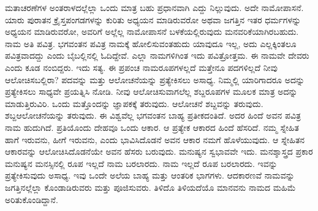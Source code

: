 ಮತಾಚರಣೆಗಳ ಅಂತರಾಳದಲ್ಲೆಲ್ಲಾ ಒಂದು ಮಾತ್ರ ಬಹು ಪ್ರಧಾನವಾಗಿ ಎದ್ದು ನಿಲ್ಲುವುದು. ಅದೇ ನಾಮೋಪಾಸನೆ. ಯಾರು ಪುರಾತನ ಕ್ರೈಸ್ತಪಂಗಡಗಳನ್ನು ಕುರಿತು ಅಧ್ಯಯನ ಮಾಡಿರುವರೋ ಅಥವಾ ಜಗತ್ತಿನ ಇತರ ಧರ್ಮಗಳನ್ನು ಅಧ್ಯಯನ ಮಾಡಿರುವರೋ, ಅವರಿಗೆ ಅಲ್ಲೆಲ್ಲ ನಾಮೋಪಾಸನೆ ಬಳಕೆಯಲ್ಲಿರುವುದು ಮನವರಿಕೆಯಾಗಿರಬಹುದು. ನಾಮ ಅತಿ ಪವಿತ್ರ. ಭಗವಂತನ ಪವಿತ್ರ ನಾಮಕ್ಕೆ ಹೋಲಿಸುವಂತಹುದು ಯಾವುದೂ ಇಲ್ಲ, ಅದು ಎಲ್ಲಕ್ಕಿಂತಲೂ ಪವಿತ್ರವಾದದ್ದು ಎಂದು ಬೈಬಲ್ಲಿನಲ್ಲಿ ಓದಿದ್ದೇವೆ. ಎಲ್ಲಾ ನಾಮಗಳಿಗಿಂತ ಇದು ಪವಿತ್ರೋತ್ತಮ. ಈ ನಾಮವೇ ದೇವರು ಎಂದು ಕೂಡ ನಂಬಿದ್ದರು. ಇದು ಸತ್ಯ. ಈ ಪ್ರಪಂಚ ನಾಮರೂಪಗಳಲ್ಲದೆ ಮತ್ತೇನೂ ಪದಗಳಿಲ್ಲದೆ ನೀವು ಆಲೋಚಿಸಬಲ್ಲಿರಾ? ಪದವನ್ನು ಮತ್ತು ಆಲೋಚನೆಯನ್ನು ಪ್ರತ್ಯೇಕಿಸಲು ಅಸಾಧ್ಯ. ನಿಮ್ಮಲ್ಲಿ ಯಾರಿಗಾದರೂ ಅದನ್ನು ಪ್ರತ್ಯೇಕಿಸಲು ಸಾಧ್ಯವೇ ಪ್ರಯತ್ನಿಸಿ ನೋಡಿ. ನೀವು ಆಲೋಚಿಸುವಾಗಲೆಲ್ಲ ಶಬ್ದರೂಪಗಳ ಮೂಲಕ ಮಾತ್ರ ಅದನ್ನು ಮಾಡುತ್ತಿರುವಿರಿ. ಒಂದು ಮತ್ತೊಂದನ್ನು ಜ್ಞಾಪಕಕ್ಕೆ ತರುವುದು. ಆಲೋಚನೆ ಶಬ್ದವನ್ನು ತರುವುದು. ಶಬ್ದ\break ಆಲೋಚನೆಯನ್ನು ತರುವುದು. ಈ ವಿಶ್ವವೆಲ್ಲ ಭಗವಂತನ ಬಾಹ್ಯ ಪ್ರತೀಕದಂತಿದೆ. ಅದರ ಹಿಂದೆ ಅವನ ಪವಿತ್ರ ನಾಮ ಹುದುಗಿದೆ. ಪ್ರತಿಯೊಂದು ದೇಹವೂ ಒಂದು ಆಕಾರ. ಆ ಪ್ರತ್ಯೇಕ ಆಕಾರದ ಹಿಂದೆ ಹೆಸರಿದೆ. ನಮ್ಮ ಸ್ನೇಹಿತ ಹಾಗೆ ಇರುವನು, ಹೀಗೆ ಇರುವನು, ಎಂದು ಭಾವಿಸಿದೊಡನೆ ಅವನ ಆಕಾರ ನಮಗೆ ಹೊಳೆಯುವುದು. ಆ ಸ್ನೇಹಿತನ ಆಕಾರವನ್ನು ಆಲೋಚಿಸಿದೊಡನೆಯೇ ಅವನ ಹೆಸರು ಬರುವುದು. ಮನುಷ್ಯನ ಸ್ವಭಾವವೇ ಇದು. ಮನಶ್ಶಾಸ್ತ್ರದ ಪ್ರಕಾರ ಮನುಷ್ಯನ ಮನಸ್ಸಿನಲ್ಲಿ ರೂಪ ಇಲ್ಲದೆ ನಾಮ ಬರಲಾರದು. ನಾಮ ಇಲ್ಲದೆ ರೂಪ ಬರಲಾರದು. ಇವನ್ನು ಪ್ರತ್ಯೇಕಿಸುವುದು ಅಸಾಧ್ಯ. ಇವು ಒಂದೇ ಅಲೆಯ ಬಾಹ್ಯ ಮತ್ತು ಆಂತರಿಕ ಭಾಗಗಳು. ಆದಕಾರಣವೆ ನಾಮವನ್ನು ಜಗತ್ತಿನಲ್ಲೆಲ್ಲಾ ಕೊಂಡಾಡಿರುವರು ಮತ್ತು ಪೂಜಿಸುವರು. ತಿಳಿದೊ ತಿಳಿಯದೆಯೊ ಮಾನವನು ನಾಮದ ಮಹಿಮೆ ಅರಿತುಕೊಂಡಿದ್ದಾನೆ.

